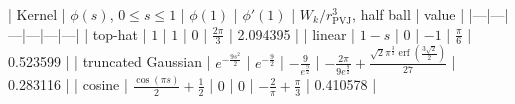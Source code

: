 | Kernel | $\phi(s)$, $0\le s\le1$ | $\phi(1)$ | $\phi'(1)$ | $W_k/r_{\mathrm{PVJ}}^3$, half ball | value |
|---|---|---|---|---|---|
| top-hat | $1$ | $1$ | $0$ | $\frac{2 \pi}{3}$ | 2.094395 |
| linear | $1 - s$ | $0$ | $-1$ | $\frac{\pi}{6}$ | 0.523599 |
| truncated Gaussian | $e^{- \frac{9 s^{2}}{2}}$ | $e^{- \frac{9}{2}}$ | $- \frac{9}{e^{\frac{9}{2}}}$ | $- \frac{2 \pi}{9 e^{\frac{9}{2}}} + \frac{\sqrt{2} \pi^{\frac{3}{2}} \operatorname{erf}{\left(\frac{3 \sqrt{2}}{2} \right)}}{27}$ | 0.283116 |
| cosine | $\frac{\cos{\left(\pi s \right)}}{2} + \frac{1}{2}$ | $0$ | $0$ | $- \frac{2}{\pi} + \frac{\pi}{3}$ | 0.410578 |
